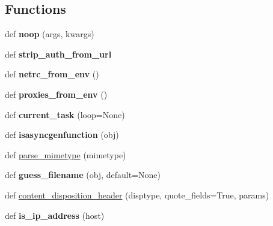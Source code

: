 \subsection*{Functions}
\begin{DoxyCompactItemize}
\item 
\mbox{\label{namespaceaiohttp_1_1helpers_af4daafea3cc3a1aeab7204efc5f95438}} 
def {\bfseries noop} (args, kwargs)
\item 
\mbox{\label{namespaceaiohttp_1_1helpers_a95c6ba122f76c537759d79f138dc2a36}} 
def {\bfseries strip\+\_\+auth\+\_\+from\+\_\+url}
\item 
\mbox{\label{namespaceaiohttp_1_1helpers_a4ac719b190dd181793566482b2425a0e}} 
def {\bfseries netrc\+\_\+from\+\_\+env} ()
\item 
\mbox{\label{namespaceaiohttp_1_1helpers_a2b77f4c5e4c80abccbdc0835f005da3c}} 
def {\bfseries proxies\+\_\+from\+\_\+env} ()
\item 
\mbox{\label{namespaceaiohttp_1_1helpers_a0967f043f3c705c77a04cac9f037dafe}} 
def {\bfseries current\+\_\+task} (loop=None)
\item 
\mbox{\label{namespaceaiohttp_1_1helpers_a4f35915d1f2d1d95a1c9e5876f8f6f85}} 
def {\bfseries isasyncgenfunction} (obj)
\item 
def \hyperlink{namespaceaiohttp_1_1helpers_ae8dd5cf366965adb5c86e71db1df9369}{parse\+\_\+mimetype} (mimetype)
\item 
\mbox{\label{namespaceaiohttp_1_1helpers_ac3b234fdadcc59b71e6644bdec19ea34}} 
def {\bfseries guess\+\_\+filename} (obj, default=None)
\item 
def \hyperlink{namespaceaiohttp_1_1helpers_a73b9c9ecada3678e1626107a082b2728}{content\+\_\+disposition\+\_\+header} (disptype, quote\+\_\+fields=True, params)
\item 
\mbox{\label{namespaceaiohttp_1_1helpers_a4850ec3bd882af621358fe14d280c6f1}} 
def {\bfseries is\+\_\+ip\+\_\+address} (host)
\item 

\end{DoxyCompactItemize}
